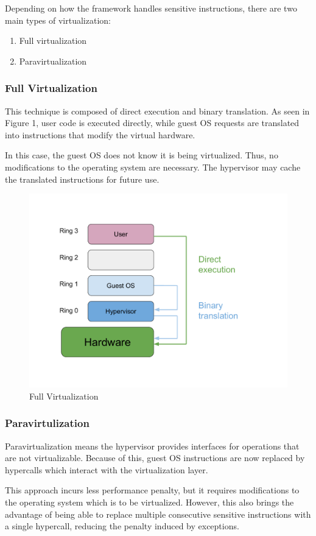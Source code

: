 Depending on how the framework handles sensitive instructions, there are two main types of virtualization\cite{vmware}:
\begin{enumerate}
\item
Full virtualization
\item
Paravirtualization
\end{enumerate}

\subsubsection{Full Virtualization}
\label{subsubsec:fullvirt}

This technique is composed of direct execution and binary translation.
As seen in Figure 1, user code is executed directly, while guest OS requests are translated into instructions that modify the virtual hardware.

In this case, the guest OS does not know it is being virtualized. Thus, no modifications to the operating system are necessary. The hypervisor may cache the translated instructions for future use.

\begin{figure}[h]
\centering
  \includegraphics[width=.65\linewidth]{img/fullvirt.pdf}
  \caption{Full Virtualization}
\end{figure}

\subsubsection{Paravirtulization}
\label{subsubsec:paravirt}

Paravirtualization means the hypervisor provides interfaces for operations that are not virtualizable. Because of this, guest OS instructions are now replaced by hypercalls which interact with the virtualization layer.

This approach incurs less performance penalty, but it requires modifications to the operating system which is to be virtualized. However, this also brings the advantage of being able to replace multiple consecutive sensitive instructions with a single hypercall, reducing the penalty induced by exceptions\cite{virt-embedded}.

